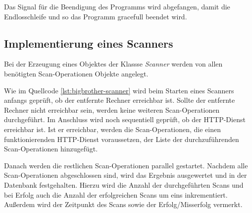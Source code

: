 Das Signal für die Beendigung des Programms wird abgefangen, damit die Endlosschleife und so das Programm gracefull beendet wird.

\subsection{Implementierung eines Scanners}
Bei der Erzeugung eines Objektes der Klassse \textit{Scanner} werden von allen benötigten Scan-Operationen Objekte angelegt.

Wie im Quellcode \autoref{lst:bigbrother-scanner} wird beim Starten eines Scanners anfangs geprüft, ob der entfernte Rechner erreichbar ist. Sollte der entfernte Rechner nicht erreichbar sein, werden keine weiteren Scan-Operationen durchgeführt. Im Anschluss wird noch sequentiell geprüft, ob der HTTP-Dienst erreichbar ist. Ist er erreichbar, werden die Scan-Operationen, die einen funktionierenden HTTP-Dienst voraussetzen, der Liste der durchzuführenden Scan-Operationen hinzugefügt.

Danach werden die restlichen Scan-Operationen parallel gestartet. Nachdem alle Scan-Operationen abgeschlossen sind, wird das Ergebnis ausgewertet und in der Datenbank festgehalten. Hierzu wird die Anzahl der durchgeführten Scans und bei Erfolg auch die Anzahl der erfolgreichen Scans um eins inkrementiert. Außerdem wird der Zeitpunkt des Scans sowie der Erfolg/Misserfolg vermerkt.

